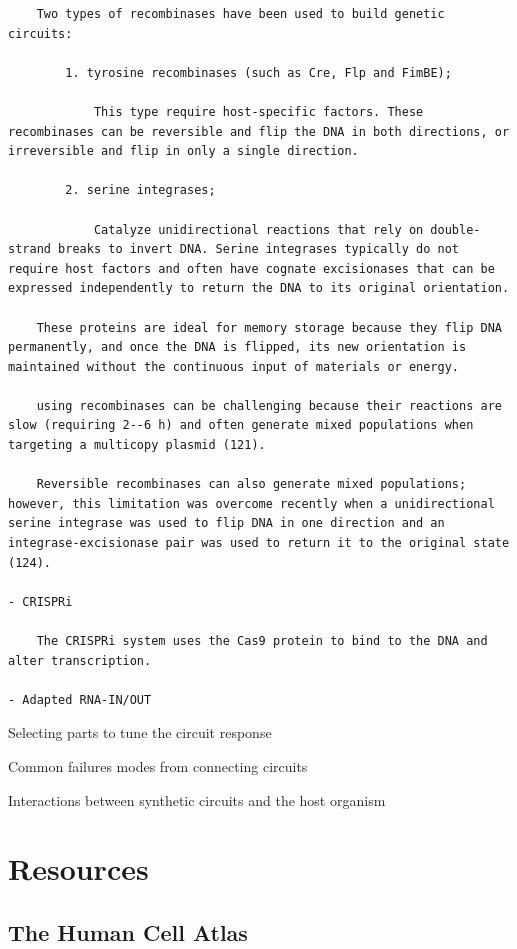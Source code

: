 \documentclass[
]{book}
\begin{document}
\begin{verbatim}
    Two types of recombinases have been used to build genetic circuits:

        1. tyrosine recombinases (such as Cre, Flp and FimBE);

            This type require host-specific factors. These recombinases can be reversible and flip the DNA in both directions, or irreversible and flip in only a single direction.

        2. serine integrases;

            Catalyze unidirectional reactions that rely on double-strand breaks to invert DNA. Serine integrases typically do not require host factors and often have cognate excisionases that can be expressed independently to return the DNA to its original orientation.

    These proteins are ideal for memory storage because they flip DNA permanently, and once the DNA is flipped, its new orientation is maintained without the continuous input of materials or energy.

    using recombinases can be challenging because their reactions are slow (requiring 2--6 h) and often generate mixed populations when targeting a multicopy plasmid (121).

    Reversible recombinases can also generate mixed populations; however, this limitation was overcome recently when a unidirectional serine integrase was used to flip DNA in one direction and an integrase-excisionase pair was used to return it to the original state (124).

- CRISPRi

    The CRISPRi system uses the Cas9 protein to bind to the DNA and alter transcription.

- Adapted RNA-IN/OUT
\end{verbatim}

Selecting parts to tune the circuit response

Common failures modes from connecting circuits

Interactions between synthetic circuits and the host organism

\hypertarget{resources}{%
\chapter{Resources}\label{resources}}

\hypertarget{the-human-cell-atlas}{%
\section{The Human Cell Atlas}\label{the-human-cell-atlas}}
\end{document}
